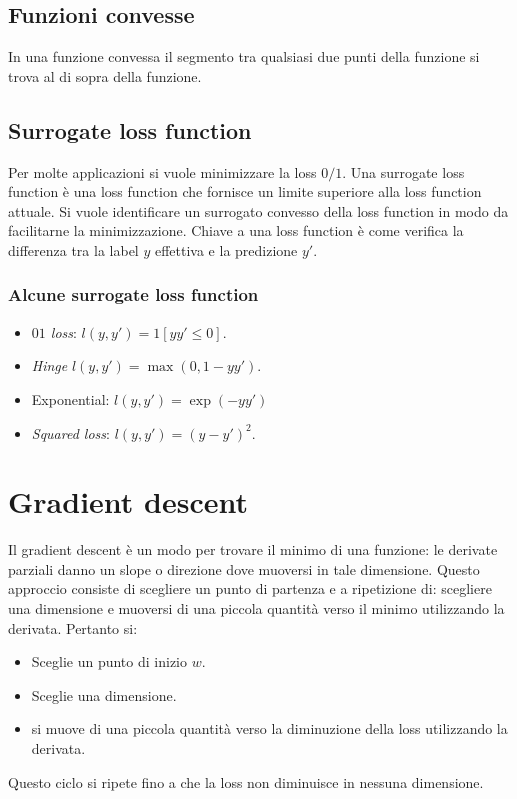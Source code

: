 	\subsection{Funzioni convesse}
	In una funzione convessa il segmento tra qualsiasi due punti della funzione si trova al di sopra della funzione.

	\subsection{Surrogate loss function}
	Per molte applicazioni si vuole minimizzare la loss $0/1$.
	Una surrogate loss function \`e una loss function che fornisce un limite superiore alla loss function attuale.
	Si vuole identificare un surrogato convesso della loss function in modo da facilitarne la minimizzazione.
	Chiave a una loss function \`e come verifica la differenza tra la label $y$ effettiva e la predizione $y'$.

		\subsubsection{Alcune surrogate loss function}
		\begin{multicols}{2}
			\begin{itemize}
				\item \emph{$01$ loss}: $l(y, y')=1[yy'\le 0]$.
				\item \emph{Hinge} $l(y,y')=\max(0,1-yy')$.
				\item Exponential: $l(y,y')=\exp(-yy')$
				\item \emph{Squared loss}: $l(y,y')=(y-y')^2$.
			\end{itemize}
		\end{multicols}

\section{Gradient descent}
Il gradient descent \`e un modo per trovare il minimo di una funzione: le derivate parziali danno un slope o direzione dove muoversi in tale dimensione.
Questo approccio consiste di scegliere un punto di partenza e a ripetizione di: scegliere una dimensione e muoversi di una piccola quantit\`a verso il minimo utilizzando la derivata.
Pertanto si:
\begin{itemize}
	\item Sceglie un punto di inizio $w$.
	\item Sceglie una dimensione.
	\item si muove di una piccola quantit\`a verso la diminuzione della loss utilizzando la derivata.
\end{itemize}
Questo ciclo si ripete fino a che la loss non diminuisce in nessuna dimensione.

